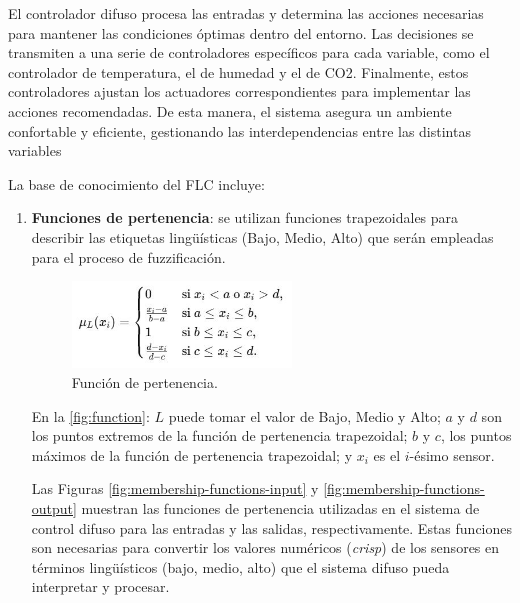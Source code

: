 El controlador difuso procesa las entradas y determina las acciones necesarias para mantener las condiciones óptimas dentro del entorno. Las decisiones se transmiten a una serie de controladores específicos para cada variable, como el controlador de temperatura, el de humedad y el de CO2. Finalmente, estos controladores ajustan los actuadores correspondientes para implementar las acciones recomendadas. De esta manera, el sistema asegura un ambiente confortable y eficiente, gestionando las interdependencias entre las distintas variables

\vspace{0.4cm}

La base de conocimiento del FLC incluye:
\begin{enumerate}
	\item \textbf{Funciones de pertenencia}: se utilizan funciones trapezoidales para describir las etiquetas lingüísticas (Bajo, Medio, Alto) que serán empleadas para el proceso de fuzzificación.
	\begin{figure}[H]
		\centering
		\includegraphics[width=0.55\textwidth]{imgs/function.JPG}
		\caption{Función de pertenencia.}
		\label{fig:function}
	\end{figure}
	
	En la \autoref{fig:function}: $L$ puede tomar el valor de Bajo, Medio y Alto; $a$ y $d$ son los puntos extremos de la función de pertenencia trapezoidal; $b$ y $c$, los puntos máximos de la función de pertenencia trapezoidal; y $x_i$ es el $i$-ésimo sensor.
	
	Las Figuras \ref{fig:membership-functions-input} y \ref{fig:membership-functions-output} muestran las funciones de pertenencia utilizadas en el sistema de control difuso para las entradas y las salidas, respectivamente. Estas funciones son necesarias para convertir los valores numéricos (\textit{crisp}) de los sensores en términos lingüísticos (bajo, medio, alto) que el sistema difuso pueda interpretar y procesar.
	

\end{enumerate}

